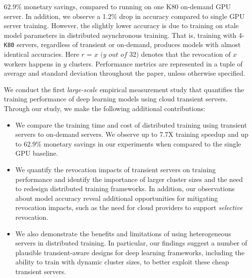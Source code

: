 \begin{table}[t]
{  62.9\% monetary savings, compared to running on one K80 on-demand GPU server.
  In addition, we observe a 1.2\% drop in accuracy compared to single GPU
  server training. However, the slightly lower accuracy is due to training on
  stale model parameters in distributed asynchronous training. That is,
  training with 4-\texttt{K80} servers, regardless of transient or on-demand, produces models with almost identical accuracies. Here $\textit{r = x (y out of 32)}$ denotes that the revocation of $x$ workers happens in $y$ clusters. 
Performance metrics are represented in a tuple of average and standard deviation throughout the paper, unless otherwise specified.}
\label{intro:tbl:motivation}
\end{table}


We conduct the first \emph{large-scale} empirical measurement study that 
quantifies the training performance of deep learning models using cloud transient servers.  
Through our study, we make the following additional contributions: 
\begin{itemize}
\item We compare the training time and cost of distributed training using transient servers to on-demand servers. We observe up to 7.7X training speedup and up to 62.9\% monetary savings
in our experiments  when compared to the single GPU baseline. 
\item We quantify the revocation impacts of transient servers on training
  performance and identify the importance of larger cluster sizes and the need
    to redesign distributed training frameworks. In addition, our observations
    about model accuracy reveal additional opportunities for mitigating
    revocation impacts, such as the need for cloud providers to support \emph{selective} revocation. 
\item We also demonstrate the benefits and limitations of using heterogeneous servers in distributed training. In particular, our findings suggest a number of plausible transient-aware designs for deep learning frameworks, including the ability to train with dynamic cluster sizes, to better exploit these cheap transient servers. 
\end{itemize}


